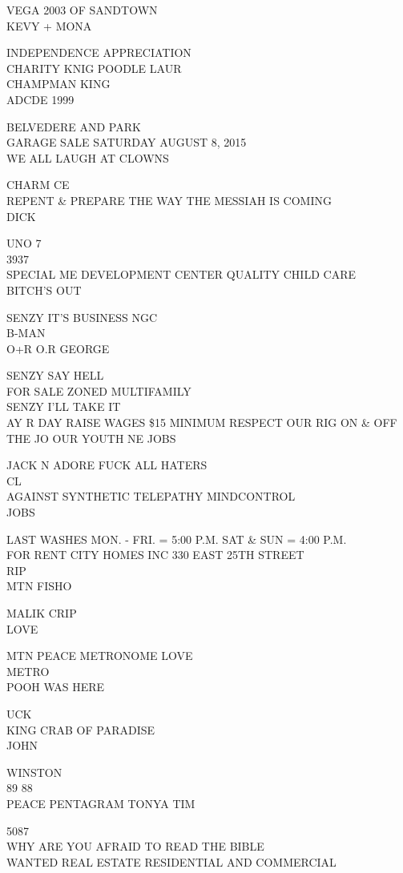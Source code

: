 \documentclass[10pt,letterpaper]{article}
\begin{document}
VEGA 2003 OF SANDTOWN\\
KEVY + MONA

INDEPENDENCE APPRECIATION\\
CHARITY KNIG POODLE LAUR\\
CHAMPMAN KING\\
ADCDE 1999

BELVEDERE AND PARK\\
GARAGE SALE SATURDAY AUGUST 8, 2015\\
WE ALL LAUGH AT CLOWNS

CHARM CE\\
REPENT \& PREPARE THE WAY THE MESSIAH IS COMING\\
DICK

UNO 7\\
3937\\
SPECIAL ME DEVELOPMENT CENTER QUALITY CHILD CARE\\
BITCH'S OUT

SENZY IT'S BUSINESS NGC\\
B{-}MAN\\
O+R O.R GEORGE

SENZY SAY HELL\\
FOR SALE ZONED MULTIFAMILY\\
SENZY I'LL TAKE IT\\
AY R DAY RAISE WAGES \$15 MINIMUM RESPECT OUR RIG ON \& OFF THE JO OUR YOUTH NE JOBS

JACK N ADORE FUCK ALL HATERS\\
CL\\
AGAINST SYNTHETIC TELEPATHY MINDCONTROL\\
JOBS

LAST WASHES MON. {-} FRI. = 5:00 P.M. SAT \& SUN = 4:00 P.M.\\
FOR RENT CITY HOMES INC 330 EAST 25TH STREET\\
RIP\\
MTN FISHO

MALIK CRIP\\
LOVE

MTN PEACE METRONOME LOVE\\
METRO\\
POOH WAS HERE

UCK\\
KING CRAB OF PARADISE\\
JOHN

WINSTON\\
89 88\\
PEACE PENTAGRAM TONYA TIM

5087\\
WHY ARE YOU AFRAID TO READ THE BIBLE\\
WANTED REAL ESTATE RESIDENTIAL AND COMMERCIAL
\end{document}
